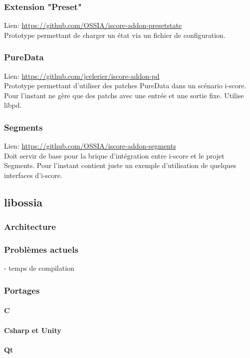 \documentclass[french,a4paper,openany,12pt]{book}
\begin{document}
\subsubsection{Extension "Preset"}
Lien: \url{https://github.com/OSSIA/iscore-addon-presetstate}~\\
Prototype permettant de charger un état via un fichier de configuration.

\subsubsection{PureData}
Lien: \url{https://github.com/jcelerier/iscore-addon-pd}~\\
Prototype permettant d'utiliser des patches PureData dans un scénario i-score. 
Pour l'instant ne gère que des patchs avec une entrée et une sortie fixe.
Utilise libpd.

\subsubsection{Segments}
Lien: \url{https://github.com/OSSIA/iscore-addon-segments}~\\
Doit servir de base pour la brique d'intégration entre i-score et le projet Segments.
Pour l'instant contient juste un exemple d'utilisation de quelques interfaces d'i-score.


\subsection{libossia}
\subsubsection{Architecture}
\subsubsection{Problèmes actuels}
- temps de compilation
\subsubsection{Portages}
\paragraph{C}
\paragraph{Csharp et Unity}
\paragraph{Qt}
\end{document}
